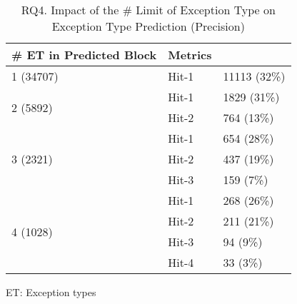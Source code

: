 \begin{table}[t]
	\caption{RQ4. Impact of the \# Limit of Exception Type on Exception Type Prediction (Precision)}
	\vspace{-10pt}
	\tabcolsep 2pt
	{\small
		\begin{center}
			\renewcommand{\arraystretch}{1}
			\begin{tabular}{p{3.5cm}<{\centering}|p{2cm}<{\centering}|p{2.5cm}<{\centering}}
				\hline
				\# ET in Predicted Block & Metrics & {\textsc{\tool}\xspace} \\
				\hline
				\multirow{1}{*}{1 (34707)}   & Hit-1  & 11113 (32\%) \\
				\hline
				\multirow{2}{*}{2 (5892)}  & Hit-1   & 1829 (31\%) \\
				& Hit-2       						& 764 (13\%) \\
				\hline
				\multirow{3}{*}{3 (2321)}  & Hit-1    & 654 (28\%) \\
				& Hit-2         					& 437 (19\%)\\
				& Hit-3         				  	& 159 (7\%) \\
				\hline
				\multirow{4}{*}{4 (1028)}  & Hit-1    & 268 (26\%) \\
				& Hit-2         					& 211 (21\%)\\
				& Hit-3         				  	& 94 (9\%) \\
				& Hit-4         				  	& 33 (3\%) \\
				\hline
			\end{tabular}
			ET: Exception types
			\label{RQ4_results_5}
		\end{center}
	}
\end{table}